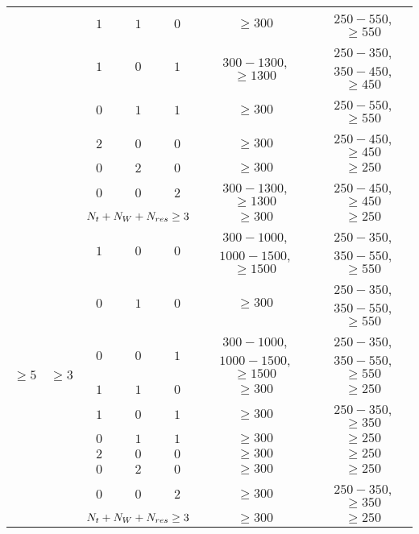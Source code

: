 \begin{table}[!ht]
\begin{center}
{\begin{tabular}{|c|c|c|c|c|c|c|}
						  &					   & $1$	 		 & $1$					& $0$			& $\geq300$ 						& $250-550$, $\geq550$ \\
						  &					   & $1$	 		 & $0$					& $1$	  		& $300-1300$, $\geq1300$ & $250-350$, $350-450$, $\geq450$ \\
						  &					   & $0$			 & $1$					& $1$	  		& $\geq300$							& $250-550$, $\geq550$ \\
						  &					   & $2$	 		 & $0$					& $0$			& $\geq300$ 						& $250-450$, $\geq450$ \\
						  &					   & $0$	 		 & $2$					& $0$	  		& $\geq300$ 						& $\geq250$ \\
						  &					   & $0$			 & $0$					& $2$	  		& $300-1300$, $\geq1300$ & $250-450$, $\geq450$ \\
						  &					   & \multicolumn{3}{|c|}{$N_{t}+N_{W}+N_{res}\geq3$} & $\geq300$ 					   & $\geq250$ \\
	\hline
	\multirow{10}{*}{$\geq5$} & \multirow{10}{*}{$\geq3$} & $1$ & $0$ & $0$ & $300-1000$, $1000-1500$, $\geq1500$ & $250-350$, $350-550$, $\geq550$\\
						  &					   & $0$			 & $1$					& $0$			& $\geq300$ 						& $250-350$, $350-550$, $\geq550$\\
						  &					   & $0$			 & $0$				    & $1$	  		& $300-1000$, $1000-1500$, $\geq1500$ & $250-350$, $350-550$, $\geq550$\\
						  &					   & $1$	 		 & $1$					& $0$			& $\geq300$ 						& $\geq250$ \\
						  &					   & $1$	 		 & $0$					& $1$	  		& $\geq300$ 						& $250-350$, $\geq350$ \\
						  &					   & $0$			 & $1$					& $1$	  		& $\geq300$							& $\geq250$ \\
						  &					   & $2$	 		 & $0$					& $0$			& $\geq300$ 						& $\geq250$ \\
						  &					   & $0$	 		 & $2$					& $0$	  		& $\geq300$ 						& $\geq250$ \\
						  &					   & $0$			 & $0$					& $2$	  		& $\geq300$ 					   & $250-350$, $\geq350$ \\
						  &					   & \multicolumn{3}{|c|}{$N_{t}+N_{W}+N_{res}\geq3$} & $\geq300$ 					   & $\geq250$ \\
	\hline
\end{tabular}
}
\end{center}
\end{table}
